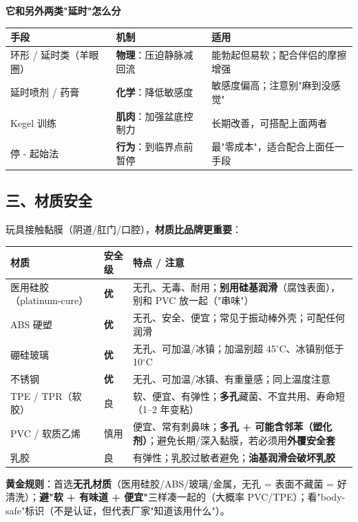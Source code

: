 \documentclass[12pt,UTF8,openany]{ctexbook}
\begin{document}
\textbf{它和另外两类"延时"怎么分}\\
\begin{tabularx}{\textwidth}{@{}l X X@{}}
\toprule
\textbf{手段} & \textbf{机制} & \textbf{适用} \\
\midrule
环形 / 延时类（羊眼圈） & \textbf{物理}：压迫静脉减回流 & 能勃起但易软；配合伴侣的摩擦增强 \\
\midrule
延时喷剂 / 药膏 & \textbf{化学}：降低敏感度 & 敏感度偏高；注意别"麻到没感觉" \\
\midrule
Kegel 训练 & \textbf{肌肉}：加强盆底控制力 & 长期改善，可搭配上面两者 \\
\midrule
停 - 起始法 & \textbf{行为}：到临界点前暂停 & 最"零成本"，适合配合上面任一手段 \\
\bottomrule
\end{tabularx}

\subsection*{三、材质安全}
玩具接触黏膜（阴道/肛门/口腔），\textbf{材质比品牌更重要}：
\begin{tabularx}{\textwidth}{X l X}
\toprule
\textbf{材质} & \textbf{安全级} & \textbf{特点 / 注意} \\
\midrule
医用硅胶（platinum-cure） & \textbf{优} & 无孔、无毒、耐用；\textbf{别用硅基润滑}（腐蚀表面），别和 PVC 放一起（"串味"） \\
ABS 硬塑 & \textbf{优} & 无孔、安全、便宜；常见于振动棒外壳；可配任何润滑 \\
硼硅玻璃 & \textbf{优} & 无孔、可加温/冰镇；加温别超 45$^\circ$C、冰镇别低于 10$^\circ$C \\
不锈钢 & \textbf{优} & 无孔、可加温/冰镇、有重量感；同上温度注意 \\
TPE / TPR（软胶） & 良 & 软、便宜、有弹性；\textbf{多孔}藏菌、不宜共用、寿命短（1--2 年变粘） \\
PVC / 软质乙烯 & 慎用 & 便宜、常有刺鼻味；\textbf{多孔 + 可能含邻苯（塑化剂）}；避免长期/深入黏膜，若必须用\textbf{外覆安全套} \\
乳胶 & 良 & 有弹性；乳胶过敏者避免；\textbf{油基润滑会破坏乳胶} \\
\bottomrule
\end{tabularx}
\par\smallskip
\textbf{黄金规则}：首选\textbf{无孔材质}（医用硅胶/ABS/玻璃/金属，无孔 = 表面不藏菌 = 好清洗）；\textbf{避"软 + 有味道 + 便宜"}三样凑一起的（大概率 PVC/TPE）；看"body-safe"标识（不是认证，但代表厂家"知道该用什么"）。
\end{document}
